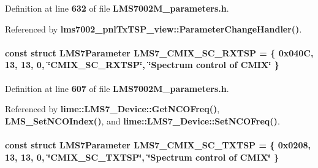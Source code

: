 Definition at line {\bf 632} of file {\bf L\+M\+S7002\+M\+\_\+parameters.\+h}.



Referenced by {\bf lms7002\+\_\+pnl\+Tx\+T\+S\+P\+\_\+view\+::\+Parameter\+Change\+Handler()}.

\paragraph[{L\+M\+S7\+\_\+\+C\+M\+I\+X\+\_\+\+S\+C\+\_\+\+R\+X\+T\+SP}]{\setlength{\rightskip}{0pt plus 5cm}const struct {\bf L\+M\+S7\+Parameter} L\+M\+S7\+\_\+\+C\+M\+I\+X\+\_\+\+S\+C\+\_\+\+R\+X\+T\+SP = \{ 0x040\+C, 13, 13, 0, \char`\"{}\+C\+M\+I\+X\+\_\+\+S\+C\+\_\+\+R\+X\+T\+S\+P\char`\"{}, \char`\"{}\+Spectrum control of C\+M\+I\+X\char`\"{} \}\hspace{0.3cm}{\ttfamily [static]}}\label{LMS7002M__parameters_8h_a346bbf7c884abc01463e7e99bf48fcee}


Definition at line {\bf 607} of file {\bf L\+M\+S7002\+M\+\_\+parameters.\+h}.



Referenced by {\bf lime\+::\+L\+M\+S7\+\_\+\+Device\+::\+Get\+N\+C\+O\+Freq()}, {\bf L\+M\+S\+\_\+\+Set\+N\+C\+O\+Index()}, and {\bf lime\+::\+L\+M\+S7\+\_\+\+Device\+::\+Set\+N\+C\+O\+Freq()}.

\paragraph[{L\+M\+S7\+\_\+\+C\+M\+I\+X\+\_\+\+S\+C\+\_\+\+T\+X\+T\+SP}]{\setlength{\rightskip}{0pt plus 5cm}const struct {\bf L\+M\+S7\+Parameter} L\+M\+S7\+\_\+\+C\+M\+I\+X\+\_\+\+S\+C\+\_\+\+T\+X\+T\+SP = \{ 0x0208, 13, 13, 0, \char`\"{}\+C\+M\+I\+X\+\_\+\+S\+C\+\_\+\+T\+X\+T\+S\+P\char`\"{}, \char`\"{}\+Spectrum control of C\+M\+I\+X\char`\"{} \}\hspace{0.3cm}{\ttfamily [static]}}\label{LMS7002M__parameters_8h_a692cd16fa8fe659c44782c314fe0e29c}


